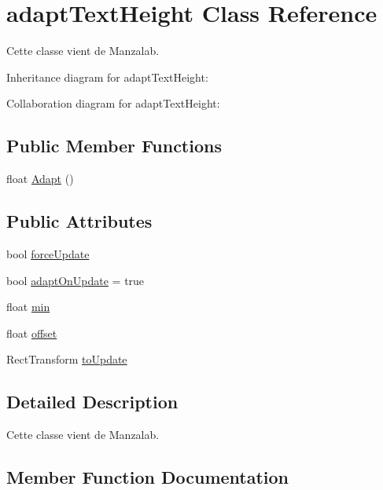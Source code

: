 \hypertarget{classadapt_text_height}{}\section{adapt\+Text\+Height Class Reference}
\label{classadapt_text_height}


Cette classe vient de Manzalab.  




Inheritance diagram for adapt\+Text\+Height\+:


Collaboration diagram for adapt\+Text\+Height\+:
\subsection*{Public Member Functions}
\begin{DoxyCompactItemize}
\item 
float \hyperlink{classadapt_text_height_a3c86301b36595789902238c84d0b0a81}{Adapt} ()
\end{DoxyCompactItemize}
\subsection*{Public Attributes}
\begin{DoxyCompactItemize}
\item 
bool \hyperlink{classadapt_text_height_a793980861b369271cafe4c1f1d340387}{force\+Update}
\item 
bool \hyperlink{classadapt_text_height_a9b72681ca8e9d937c175be59b61f4f46}{adapt\+On\+Update} = true
\item 
float \hyperlink{classadapt_text_height_a3e4b59e0f1bd58184e6ed8d6f7507728}{min}
\item 
float \hyperlink{classadapt_text_height_ac9b7c41e38605d5ef479ddb6f9a4803b}{offset}
\item 
Rect\+Transform \hyperlink{classadapt_text_height_aab8f7f20bb5edb4f6011e2f276c273a1}{to\+Update}
\end{DoxyCompactItemize}


\subsection{Detailed Description}
Cette classe vient de Manzalab. 



\subsection{Member Function Documentation}
\mbox{\label{classadapt_text_height_a3c86301b36595789902238c84d0b0a81}} 
